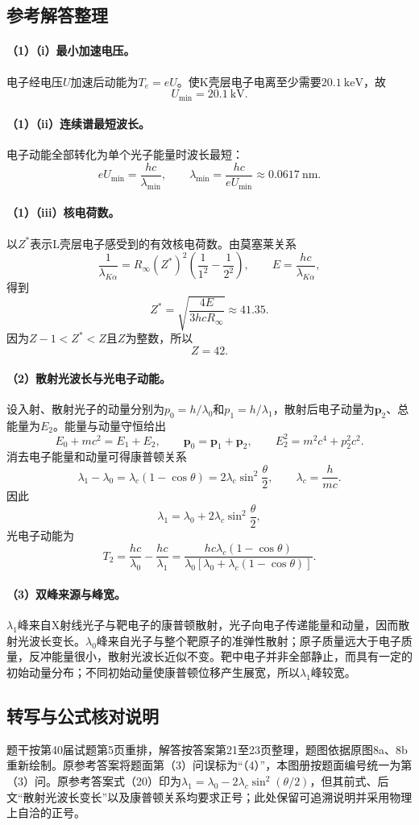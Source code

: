 \subsection{参考解答整理}

\paragraph{（1）（i）最小加速电压。}
电子经电压$U$加速后动能为$T_e=eU$。使K壳层电子电离至少需要$20.1\ \mathrm{keV}$，故
\[
\boxed{U_{\min}=20.1\ \mathrm{kV}}.
\]

\paragraph{（1）（ii）连续谱最短波长。}
电子动能全部转化为单个光子能量时波长最短：
\[
eU_{\min}=\frac{hc}{\lambda_{\min}},\qquad
\boxed{\lambda_{\min}=\frac{hc}{eU_{\min}}\approx0.0617\ \mathrm{nm}}.
\]

\paragraph{（1）（iii）核电荷数。}
以$Z^*$表示L壳层电子感受到的有效核电荷数。由莫塞莱关系
\[
\frac{1}{\lambda_{K\alpha}}=R_\infty (Z^*)^2
\left(\frac{1}{1^2}-\frac{1}{2^2}\right),
\qquad E=\frac{hc}{\lambda_{K\alpha}},
\]
得到
\[
Z^*=\sqrt{\frac{4E}{3hcR_\infty}}\approx41.35.
\]
因为$Z-1<Z^*<Z$且$Z$为整数，所以
\[
\boxed{Z=42}.
\]

\paragraph{（2）散射光波长与光电子动能。}
设入射、散射光子的动量分别为$p_0=h/\lambda_0$和$p_1=h/\lambda_1$，散射后电子动量为$\boldsymbol p_2$、总能量为$E_2$。能量与动量守恒给出
\[
E_0+mc^2=E_1+E_2,\qquad
\boldsymbol p_0=\boldsymbol p_1+\boldsymbol p_2,
\qquad E_2^2=m^2c^4+p_2^2c^2.
\]
消去电子能量和动量可得康普顿关系
\[
\boxed{\lambda_1-\lambda_0
=\lambda_c(1-\cos\theta)
=2\lambda_c\sin^2\frac{\theta}{2}},
\qquad \lambda_c=\frac{h}{mc}.
\]
因此
\[
\boxed{\lambda_1=\lambda_0+2\lambda_c\sin^2\frac{\theta}{2}},
\]
光电子动能为
\[
\boxed{T_2=\frac{hc}{\lambda_0}-\frac{hc}{\lambda_1}
=\frac{hc\lambda_c(1-\cos\theta)}
{\lambda_0[\lambda_0+\lambda_c(1-\cos\theta)]}}.
\]

\paragraph{（3）双峰来源与峰宽。}
$\lambda_1$峰来自X射线光子与靶电子的康普顿散射，光子向电子传递能量和动量，因而散射光波长变长。$\lambda_0$峰来自光子与整个靶原子的准弹性散射；原子质量远大于电子质量，反冲能量很小，散射光波长近似不变。靶中电子并非全部静止，而具有一定的初始动量分布；不同初始动量使康普顿位移产生展宽，所以$\lambda_1$峰较宽。

\subsection{转写与公式核对说明}
题干按第40届试题第5页重排，解答按答案第21至23页整理，题图依据原图8a、8b重新绘制。原参考答案将题面第（3）问误标为“（4）”，本图册按题面编号统一为第（3）问。原参考答案式（20）印为$\lambda_1=\lambda_0-2\lambda_c\sin^2(\theta/2)$，但其前式、后文“散射光波长变长”以及康普顿关系均要求正号；此处保留可追溯说明并采用物理上自洽的正号。
